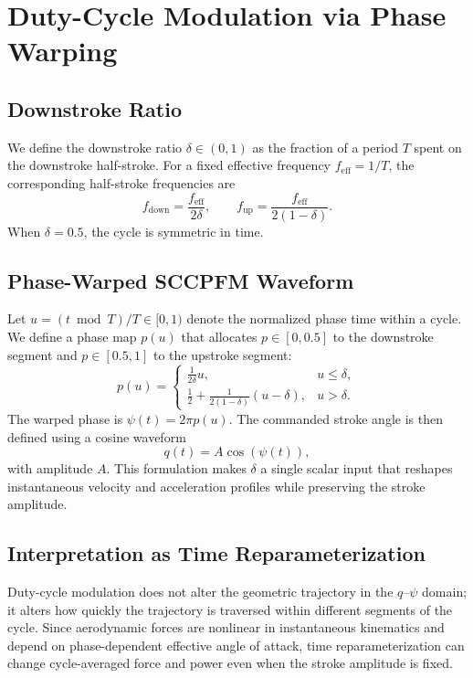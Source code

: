 \section{Duty-Cycle Modulation via Phase Warping}
\subsection{Downstroke Ratio}
We define the downstroke ratio $\delta \in (0,1)$ as the fraction of a period $T$ spent on the downstroke half-stroke.
For a fixed effective frequency $f_{\mathrm{eff}}=1/T$, the corresponding half-stroke frequencies are
\begin{equation}
f_{\mathrm{down}} = \frac{f_{\mathrm{eff}}}{2\delta}, \qquad
f_{\mathrm{up}} = \frac{f_{\mathrm{eff}}}{2(1-\delta)}.
\end{equation}
When $\delta = 0.5$, the cycle is symmetric in time.

\subsection{Phase-Warped SCCPFM Waveform}
Let $u = (t \bmod T)/T \in [0,1)$ denote the normalized phase time within a cycle.
We define a phase map $p(u)$ that allocates $p \in [0,0.5]$ to the downstroke segment and $p \in [0.5,1]$ to the upstroke segment:
\begin{equation}
p(u) =
\begin{cases}
\frac{1}{2\delta}u, & u \le \delta,\\
\frac{1}{2} + \frac{1}{2(1-\delta)}(u-\delta), & u > \delta.
\end{cases}
\end{equation}
The warped phase is $\psi(t) = 2\pi p(u)$.
The commanded stroke angle is then defined using a cosine waveform
\begin{equation}
q(t) = A \cos(\psi(t)),
\end{equation}
with amplitude $A$.
This formulation makes $\delta$ a single scalar input that reshapes instantaneous velocity and acceleration profiles while preserving the stroke amplitude.

\subsection{Interpretation as Time Reparameterization}
Duty-cycle modulation does not alter the geometric trajectory in the $q$--$\psi$ domain; it alters how quickly the trajectory is traversed within different segments of the cycle.
Since aerodynamic forces are nonlinear in instantaneous kinematics and depend on phase-dependent effective angle of attack, time reparameterization can change cycle-averaged force and power even when the stroke amplitude is fixed.
